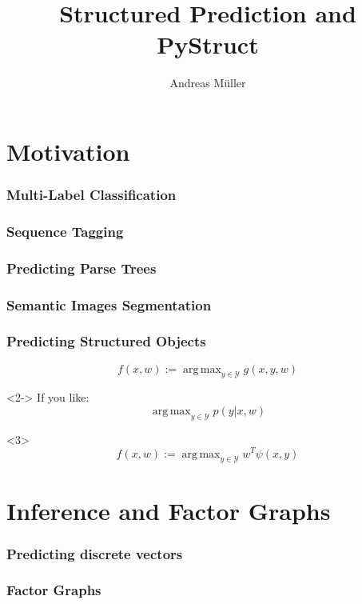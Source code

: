\documentclass{beamer}
\title{Structured Prediction and PyStruct}
\author[short]{Andreas M\"uller}%
\DeclareMathOperator*{\argmax}{arg\,max}
\begin{document}
	\begin{frame}[plain]
		\titlepage
	\end{frame}

    \section{Motivation}
    \begin{frame}
        \frametitle{Multi-Label Classification}
    \end{frame}

    \begin{frame}
        \frametitle{Sequence Tagging}
    \end{frame}

    \begin{frame}
        \frametitle{Predicting Parse Trees}
    \end{frame}

    \begin{frame}
        \frametitle{Semantic Images Segmentation}
    \end{frame}

    \begin{frame}
        \frametitle{Predicting Structured Objects}
        \[f(x, w) := \argmax_{y \in \mathcal{Y}}  g(x, y, w) \]
        \begin{visibleenv}<2->
        If you like:
        \[\argmax_{y \in \mathcal{Y}}  p(y|x, w) \]
        \end{visibleenv}
        
        \begin{visibleenv}<3>
        \[f(x, w) := \argmax_{y \in \mathcal{Y}}  w^T \psi(x, y) \]
        \end{visibleenv}
    \end{frame}

    \section{Inference and Factor Graphs}
    \begin{frame}
        \frametitle{Predicting discrete vectors}
    \end{frame}

    \begin{frame}
        \frametitle{Factor Graphs}
    \end{frame}
\end{document}

